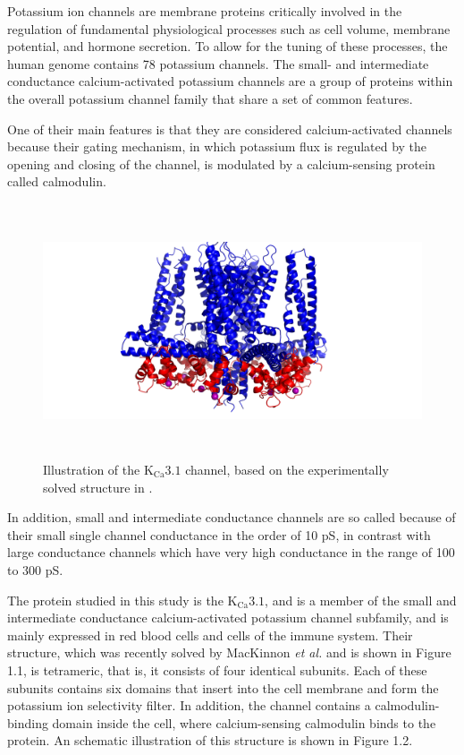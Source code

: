 \hspace{1.5cm}Potassium ion channels are membrane proteins critically involved in the regulation of fundamental physiological processes such as cell volume, membrane potential, and hormone secretion. To allow for the tuning of these processes, the human genome contains 78 potassium channels. The small- and intermediate conductance calcium-activated potassium channels are a group of proteins within the overall potassium channel family that share a set of common features.

One of their main features is that they are considered calcium-activated channels because their gating mechanism, in which potassium flux is regulated by the opening and closing of the channel, is modulated by a calcium-sensing protein called calmodulin.

\begin{figure}[h]
\includegraphics[width=15cm, height=7.5cm]{Images/Introduction/sk4.png}
\centering
\caption{Illustration of the $\text{K}_{\text{Ca}}3.1$ channel, based on the experimentally solved structure in \cite{sk4_struct}.}
\label{fig:Figure 3.1}
\end{figure}

In addition, small and intermediate conductance channels are so called because of their small single channel conductance in the order of 10 pS, in contrast with large conductance channels which have very high conductance in the range of 100 to 300 pS.

The protein studied in this study is the $\text{K}_{\text{Ca}}3.1$, and is a member of the small and intermediate conductance calcium-activated potassium channel subfamily, and is mainly expressed in red blood cells and cells of the immune system. Their structure, which was recently solved by MacKinnon \textit{et al.} \cite{sk4_struct} and is shown in Figure 1.1, is tetrameric, that is, it consists of four identical subunits. Each of these subunits contains six domains that insert into the cell membrane and form the potassium ion selectivity filter. In addition, the channel contains a calmodulin-binding domain inside the cell, where calcium-sensing calmodulin binds to the protein.  An schematic illustration of this structure is shown in Figure 1.2.

